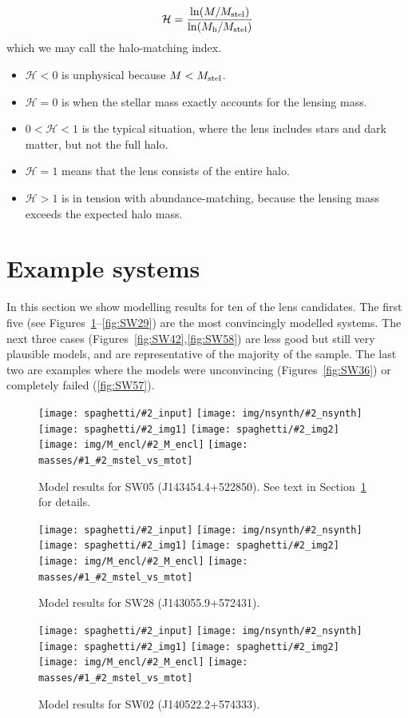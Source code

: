 \documentclass[fleqn,usenatbib]{mnras}
\newcommand{\inclfign}[2]{
  \centering
	\texttt{[image: spaghetti/\#2\_input]}%
	\texttt{[image: img/nsynth/\#2\_nsynth]}
	\texttt{[image: spaghetti/\#2\_img1]}%
	\texttt{[image: spaghetti/\#2\_img2]}
	\texttt{[image: img/M\_encl/\#2\_M\_encl]}%
	\texttt{[image: masses/\#1\_\#2\_mstel\_vs\_mtot]}
}
\newcommand{\figref}[1]{\ref{fig:#1}}
\newcommand{\Mstel}{M_{\rm stel}}
\newcommand{\Mhalo}{M_{\rm h}}
\newcommand{\haloindex}{\mathcal{H}}
\begin{document}
\begin{equation}
\haloindex = \frac{\ln(M/\Mstel)}{\ln(\Mhalo/\Mstel)}
\end{equation}
which we may call the halo-matching index.
\begin{itemize}
\item $\haloindex < 0$ is unphysical because $M<\Mstel$.
\item $\haloindex = 0$ is when the stellar mass exactly accounts for the
  lensing mass.
\item $0 < \haloindex < 1$ is the typical situation, where the lens
  includes stars and dark matter, but not the full halo.
\item $\haloindex = 1$ means that the lens consists of the entire halo.
\item $\haloindex > 1$ is in tension with abundance-matching, because the
  lensing mass exceeds the expected halo mass.
\end{itemize}


\section{Example systems}\label{sec:examples}

In this section we show modelling results for ten of the lens
candidates.  The first five (see Figures~\figref{SW05}--\figref{SW29})
are the most convincingly modelled systems.  The next three cases
(Figures~\figref{SW42},\figref{SW58}) are less good but still very
plausible models, and are representative of the majority of the
sample.  The last two are examples where the models were unconvincing
(Figures~\figref{SW36}) or completely failed (\figref{SW57}).

\begin{figure}
  \inclfign{SW05}{ASW0007k4r_AJIBCHQ6EM}
  \caption{Model results for SW05 (J143454.4+522850).  See text in
    Section~\ref{sec:examples} for details.}
  \label{fig:SW05}
\end{figure}

\begin{figure}
  \inclfign{SW28}{ASW0007xrs_JHC3J2HYV7}
  \caption{Model results for SW28 (J143055.9+572431).}
  \label{fig:SW28}
\end{figure}

\begin{figure}
  \inclfign{SW02}{ASW000619d_011489}
  \caption{Model results for SW02 (J140522.2+574333).}
  \label{fig:SW02}
\end{figure}
\end{document}
